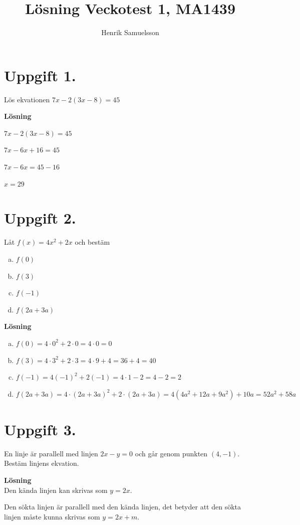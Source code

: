\documentclass{article}
\begin{document}
\begin{titlepage}
\title{Lösning Veckotest 1, MA1439}
\author{Henrik Samuelsson}
\maketitle
\thispagestyle{empty}
\end{titlepage}

\section*{Uppgift 1.}
Lös ekvationen $7x-2(3x-8)=45$

\textbf{Lösning}

$7x-2(3x-8)=45$

$7x-6x+16=45$

$7x-6x=45-16$

$x=29$

\section*{Uppgift 2.}
Låt $f(x)=4x^{2}+2x$ och bestäm
\begin{enumerate}[(a)]
\item $f(0)$
\item $f(3)$
\item $f(-1)$
\item $f(2a + 3a)$
\end{enumerate}

\textbf{Lösning}
\begin{enumerate}[(a)]
\item $f(0)=4\cdot0^2+2\cdot0=4\cdot0=0$
\item $f(3)=4\cdot3^2+2\cdot3=4\cdot9+4=36+4=40$
\item $f(-1)=4(-1)^2+2(-1)=4\cdot1-2=4-2=2$
\item $f(2a+3a)=4\cdot(2a+3a)^2+2\cdot(2a+3a)=4(4a^2+12a+9a^2)+10a=52a^2+58a$
\end{enumerate}

\section*{Uppgift 3.}
En linje är parallell med linjen $2x - y = 0$ och går genom punkten $(4, -1)$. Bestäm linjens ekvation.

\textbf{Lösning}\\
Den kända linjen kan skrivas som $y = 2x$.

Den sökta linjen är parallell med den kända linjen, det betyder att den sökta linjen måste kunna skrivas som $y = 2x + m$.
\end{document}
